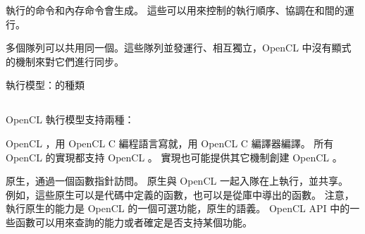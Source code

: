 執行的命令和內存命令會生成。
這些可以用來控制的執行順序、協調在和間的運行。

多個隊列可以共用同一個。這些隊列並發運行、相互獨立，OpenCL 中沒有顯式的機制來對它們進行同步。

\startbuffer[buftitleexecmck]
執行模型：的種類
\stopbuffer
\subsection{\getbuffer[buftitleexecmck]}
OpenCL 執行模型支持兩種：
\startigBase
\item {\ftEmp OpenCL }，用 OpenCL C 編程語言寫就，用 OpenCL C 編譯器編譯。
所有 OpenCL 的實現都支持 OpenCL 。
實現也可能提供其它機制創建 OpenCL 。

\item {\ftEmp 原生}，通過一個函數指針訪問。
原生與 OpenCL 一起入隊在上執行，並共享。
例如，這些原生可以是代碼中定義的函數，也可以是從庫中導出的函數。
注意，執行原生的能力是 OpenCL 的一個可選功能，原生的語義。
OpenCL API 中的一些函數可以用來查詢的能力或者確定是否支持某個功能。
\stopigBase


